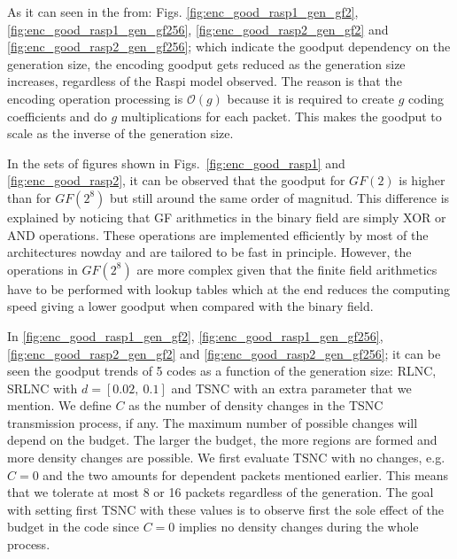 %
As it can seen in the from: Figs. \ref{fig:enc_good_rasp1_gen_gf2},
\ref{fig:enc_good_rasp1_gen_gf256}, \ref{fig:enc_good_rasp2_gen_gf2} and
\ref{fig:enc_good_rasp2_gen_gf256}; which indicate the goodput dependency
on the generation size, the encoding goodput gets reduced as the generation
size increases, regardless of the \ac{Raspi} model observed. The reason
is that the encoding operation processing is $\mathcal{O}(g)$ because
it is required to create $g$ coding coefficients and do $g$ multiplications
for each packet. This makes the goodput to scale as the inverse of the
generation size.

In the sets of figures shown in Figs.~\ref{fig:enc_good_rasp1} and
\ref{fig:enc_good_rasp2}, it can be observed that the goodput for $GF(2)$
is higher than for $GF(2^8)$ but still around the same order of magnitud.
This difference is explained by noticing that \ac{GF} arithmetics in the
binary field are simply XOR or AND operations. These operations are
implemented efficiently by most of the architectures nowday and are
tailored to be fast in principle. However, the operations in $GF(2^8)$
are more complex given that the finite field arithmetics have to be
performed with lookup tables which at the end reduces the computing
speed giving a lower goodput when compared with the binary field.

In \ref{fig:enc_good_rasp1_gen_gf2}, \ref{fig:enc_good_rasp1_gen_gf256},
\ref{fig:enc_good_rasp2_gen_gf2} and \ref{fig:enc_good_rasp2_gen_gf256};
it can be seen the goodput trends of 5 codes as a function of
the generation size: \ac{RLNC}, \ac{SRLNC} with $d = [0.02,\ 0.1]$
and \ac{TSNC} with an extra parameter that we mention. We define
$C$ as the number of density changes in the \ac{TSNC} transmission
process, if any. The maximum number of possible changes will depend
on the budget. The larger the budget, the more regions are formed and
more density changes are possible. We first evaluate \ac{TSNC} with no
changes, e.g. $C = 0$ and the two amounts for dependent packets mentioned
earlier. This means that we tolerate at most 8 or 16 packets regardless of
the generation. The goal with setting first \ac{TSNC} with these values
is to observe first the sole effect of the budget in the code since
$C = 0$ implies no density changes during the whole process.

